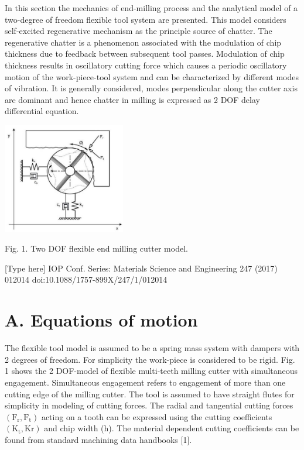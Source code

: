 \documentclass[10pt]{article}
\begin{document}
In this section the mechanics of end-milling process and the analytical model of a two-degree of freedom flexible tool system are presented. This model considers self-excited regenerative mechanism as the principle source of chatter. The regenerative chatter is a phenomenon associated with the modulation of chip thickness due to feedback between subsequent tool passes. Modulation of chip thickness results in oscillatory cutting force which causes a periodic oscillatory motion of the work-piece-tool system and can be characterized by different modes of vibration. It is generally considered, modes perpendicular along the cutter axis are dominant and hence chatter in milling is expressed as 2 DOF delay differential equation.

\begin{center}
\includegraphics[max width=0.4\textwidth]{images/01948e67-2b92-7dd1-b16f-a9746c8d80be_2_588_1517_471_427_0.jpg}
\end{center}
\hspace*{3em} 

Fig. 1. Two DOF flexible end milling cutter model.

[Type here] IOP Conf. Series: Materials Science and Engineering 247 (2017) 012014 doi:10.1088/1757-899X/247/1/012014

\section*{A. Equations of motion}

The flexible tool model is assumed to be a spring mass system with dampers with 2 degrees of freedom. For simplicity the work-piece is considered to be rigid. Fig. 1 shows the 2 DOF-model of flexible multi-teeth milling cutter with simultaneous engagement. Simultaneous engagement refers to engagement of more than one cutting edge of the milling cutter. The tool is assumed to have straight flutes for simplicity in modeling of cutting forces. The radial and tangential cutting forces \(\left( {{\mathrm{F}}_{\mathrm{r}},{\mathrm{F}}_{\mathrm{t}}}\right)\) acting on a tooth can be expressed using the cutting coefficients \(\left( {{\mathrm{K}}_{\mathrm{t}},\mathrm{{Kr}}}\right)\) and chip width (h). The material dependent cutting coefficients can be found from standard machining data handbooks [1].
\end{document}
